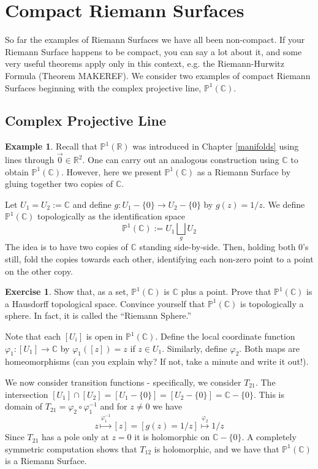 \documentclass[12pt]{book}%
\theoremstyle{plain}
\theoremstyle{definition}
\newtheorem{example}[theorem]{Example}
\newtheorem{exercise}{Exercise}
\theoremstyle{remark}
\def\to{\rightarrow}
\def\bC{{\mathbb{C}}}
\def\bP{{\mathbb{P}}}
\def\bR{{\mathbb{R}}}
\newcommand{\PoneC}{{\mathbb P}^1({\mathbb C})}
\begin{document}
\section{Compact Riemann Surfaces}

So far the examples of Riemann Surfaces we have all been non-compact. If your Riemann Surface happens to be compact, you can say a lot about it, and some very useful theorems apply only in this context, e.g. the Riemann-Hurwitz Formula (Theorem MAKEREF). We consider two examples of compact Riemann Surfaces beginning with the complex projective line, $\PoneC$. 

\subsection{Complex Projective Line}
\begin{example}
\label{complexProjectiveLine}
Recall that $\bP^1(\bR)$ was introduced in Chapter \ref{manifolds} using lines through $\vec{0} \in \bR^2$. One can carry out an analogous construction using $\bC$ to obtain $\PoneC$. However, here we present $\PoneC$ as a Riemann Surface by gluing together two copies of $\bC$.

Let $U_1=U_2:=\bC$ and define $g:U_1-\{0\} \to U_2-\{0\}$ by $g(z) = 1/z$. We define $\PoneC$ topologically as the identification space
\[
\PoneC:= U_1 \bigsqcup_{g} U_2
\]
The idea is to have two copies of $\bC$ standing side-by-side.  Then, holding both $0$'s still, fold the copies towards each other, identifying each non-zero point to a point on the other copy.

\begin{exercise}
\label{topologyOfP1C}
Show that, as a set, $\PoneC$ is $\bC$ plus a point. Prove that $\PoneC$ is a Hausdorff topological space. Convince yourself that $\PoneC$ is topologically a sphere. In fact, it is called the ``Riemann Sphere.''
\end{exercise}


Note that each $[U_i]$ is open in $\PoneC$. Define the local coordinate function $\varphi_1: [U_1] \to \bC$ by $\varphi_1([z])=z$ if $z \in U_1$. Similarly, define $\varphi_2$. Both maps are homeomorphisms (can you explain why? If not, take a minute and write it out!).

We now consider transition functions - specifically, we consider $T_{21}$. The intersection $[U_1]\cap[U_2]=[U_1-\{0\}]=[U_2-\{0\}]=\bC-\{0\}$. This is domain of $T_{21}=\varphi_2 \circ \varphi_1^{-1}$ and for $z\neq0$ we have
\[
z \stackrel{\varphi_1^{-1}}{\longmapsto}
[z] = [g(z) = 1/z] 
\stackrel{\varphi_2}{\longmapsto}
1/z
\]
Since $T_{21}$ has a pole only at $z=0$ it is holomorphic on $\bC-\{0\}$. A completely symmetric computation shows that $T_{12}$ is holomorphic, and we have that $\PoneC$ is a Riemann Surface.
\end{example}
\end{document}
